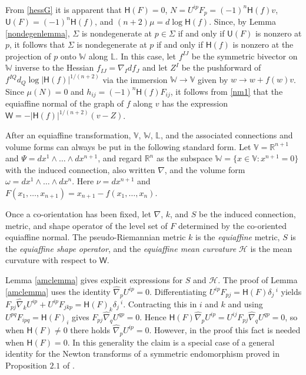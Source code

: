 \documentclass [leqno, 10pt]{amsart}
\theoremstyle{definition}
\numberwithin{equation}{section}
\newcommand{\stl}{\mathbb{L}}
\newcommand{\muf}{\mu}
\newcommand{\amc}{\mathcal{H}}
\newcommand{\stw}{\mathbb{W}}
\newcommand{\U}{\mathsf{U}}
\renewcommand{\H}{\mathsf{H}}
\newcommand{\om}{\omega}
\newcommand{\nm}{\mathsf{W}}
\newcommand{\ste}{\mathbb{V}}
\newcommand{\hnabla}{\widehat{\nabla}}
\newcommand{\rea}{\mathbb R}
\renewcommand{\L}{\mathbb{L}}
\begin{document}
\begin{example}
\begin{align}
\end{align}
From \eqref{hessG} it is apparent that $\H(F) = 0$, $N = U^{ip}F_{p} = (-1)^{n}\H(f)v$, $\U(F) =  (-1)^{n}\H(f)$, and $(n+2)\muf = d\log \H(f)$. Since, by Lemma \ref{nondegenlemma}, $\Sigma$ is nondegenerate at $p \in \Sigma$ if and only if $\U(F)$ is nonzero at $p$, it follows that $\Sigma$ is nondegenerate at $p$ if and only if $\H(f)$ is nonzero at the projection of $p$ onto $\stw$ along $\stl$. In this case, let $f^{IJ}$ be the symmetric bivector on $\stw$ inverse to the Hessian $f_{IJ} = \nabla_{I}df_{J}$ and let $Z^{I}$ be the pushforward of $f^{IQ}d_{Q}\log|\H(f)|^{1/(n+2)}$ via the immersion $\stw \to \ste$ given by $w \to w + f(w)v$. Since $\muf(N) = 0$ and $h_{ij} = (-1)^{n}\H(f)F_{ij}$, it follows from \eqref{nm1} that the equiaffine normal of the graph of $f$ along $v$ has the expression $\nm = -|\H(f)|^{1/(n+2)}(v - Z)$.  %

After an equiaffine transformation, $\ste$, $\stw$, $\L$, and the associated connections and volume forms can always be put in the following standard form. Let $\ste = \rea^{n+1}$ and $\Psi = dx^{1}\wedge \dots \wedge dx^{n+1}$, and regard $\rea^{n}$ as the subspace $\stw = \{x \in \ste: x^{n+1} = 0\}$ with the induced connection, also written $\nabla$, and the volume form $\om =dx^{1}\wedge \dots \wedge dx^{n}$. Here $\nu = dx^{n+1}$ and $F(x_{1}, \dots, x_{n+1}) = x_{n+1} - f(x_{1}, \dots, x_{n})$. 
\end{example}

Once a co-orientation has been fixed, let $\nabla$, $k$, and $S$ be the induced connection, metric, and shape operator of the level set of $F$ determined by the co-oriented equiaffine normal. The pseudo-Riemannian metric $k$ is the \textit{equiaffine} metric, $S$ is the \textit{equiaffine shape operator}, and the \textit{equiaffine mean curvature} $\amc$ is the mean curvature with respect to $\nm$. 

Lemma \ref{amclemma} gives explicit expressions for $S$ and $\amc$. The proof of Lemma \ref{amclemma} uses the identity $\hnabla_{p}U^{ip} = 0$. Differentiating $U^{ip}F_{pj} = \H(F)\delta_{j}\,^{i}$ yields $F_{pj}\hnabla_{k}U^{ip} + U^{ip}F_{jkp} = \H(F)_{k}\delta_{j}\,^{i}$. Contracting this in $i$ and $k$ and using $U^{pq}F_{ipq} = \H(F)_{i}$ gives $F_{pj}\hnabla_{q}U^{qp} = 0$. Hence $\H(F)\hnabla_{p}U^{ip} = U^{ij}F_{pj}\hnabla_{q}U^{qp} = 0$, so when $\H(F) \neq 0$ there holds $\hnabla_{p}U^{ip} = 0$. However, in the proof this fact is needed when $\H(F) = 0$. In this generality the claim is a special case of a general identity for the Newton transforms of a symmetric endomorphism proved in Proposition $2.1$ of \cite{Reilly}.
\end{document}
